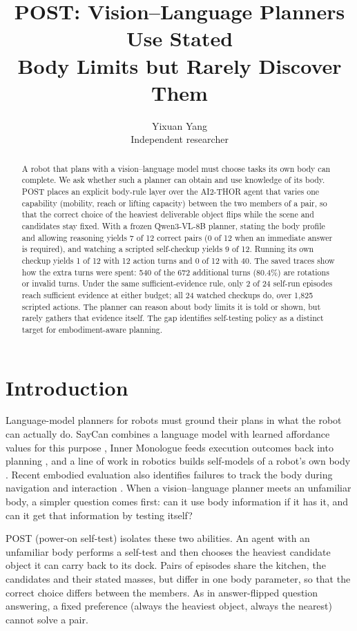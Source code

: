 \documentclass{article}
\title{POST: Vision--Language Planners Use Stated\\Body Limits but Rarely Discover Them}
\author{Yixuan Yang\\Independent researcher}
\begin{document}
\maketitle
{}

\begin{abstract}
A robot that plans with a vision--language model must choose tasks its own body can complete. We ask whether such a planner can obtain and use knowledge of its body. POST places an explicit body-rule layer over the AI2-THOR agent that varies one capability (mobility, reach or lifting capacity) between the two members of a pair, so that the correct choice of the heaviest deliverable object flips while the scene and candidates stay fixed. With a frozen Qwen3-VL-8B planner, stating the body profile and allowing reasoning yields 7 of 12 correct pairs (0 of 12 when an immediate answer is required), and watching a scripted self-checkup yields 9 of 12. Running its own checkup yields 1 of 12 with 12 action turns and 0 of 12 with 40. The saved traces show how the extra turns were spent: 540 of the 672 additional turns (80.4\%) are rotations or invalid turns. Under the same sufficient-evidence rule, only 2 of 24 self-run episodes reach sufficient evidence at either budget; all 24 watched checkups do, over 1,825 scripted actions. The planner can reason about body limits it is told or shown, but rarely gathers that evidence itself. The gap identifies self-testing policy as a distinct target for embodiment-aware planning.
\end{abstract}

\section{Introduction}

Language-model planners for robots must ground their plans in what the robot can actually do. SayCan combines a language model with learned affordance values for this purpose \citep{ahn2022saycan}, Inner Monologue feeds execution outcomes back into planning \citep{huang2022inner}, and a line of work in robotics builds self-models of a robot's own body \citep{cully2015robots,chen2022fullbody}. Recent embodied evaluation also identifies failures to track the body during navigation and interaction \citep{li2026humanclaw}. When a vision--language planner meets an unfamiliar body, a simpler question comes first: can it use body information if it has it, and can it get that information by testing itself?

POST (power-on self-test) isolates these two abilities. An agent with an unfamiliar body performs a self-test and then chooses the heaviest candidate object it can carry back to its dock. Pairs of episodes share the kitchen, the candidates and their stated masses, but differ in one body parameter, so that the correct choice differs between the members. As in answer-flipped question answering, a fixed preference (always the heaviest object, always the nearest) cannot solve a pair.
\end{document}
